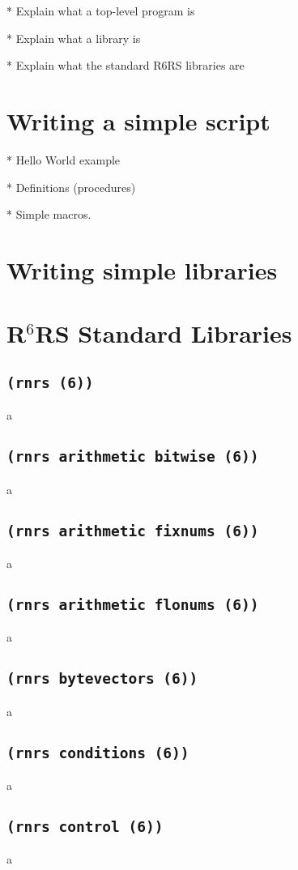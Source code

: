 \documentclass[onecolumn, 12pt, twoside, openright, dvipdfm]{book}
\newcommand{\rnrs}[1]{R$^{\mathrm{#1}}$RS}
\begin{document}
* Explain what a top-level program is

* Explain what a library is

* Explain what the standard R6RS libraries are

\section{\label{sec:scripts}Writing a simple script}

* Hello World example

* Definitions (procedures)

* Simple macros.

\section{Writing simple libraries}

\section{\rnrs{6} Standard Libraries}

\subsection{\texttt{(rnrs (6))}}
a
\subsection{\texttt{(rnrs arithmetic bitwise (6))}}
a
\subsection{\texttt{(rnrs arithmetic fixnums (6))}}
a
\subsection{\texttt{(rnrs arithmetic flonums (6))}}
a
\subsection{\texttt{(rnrs bytevectors (6))}}
a
\subsection{\texttt{(rnrs conditions (6))}}
a
\subsection{\texttt{(rnrs control (6))}}
a
\end{document}
